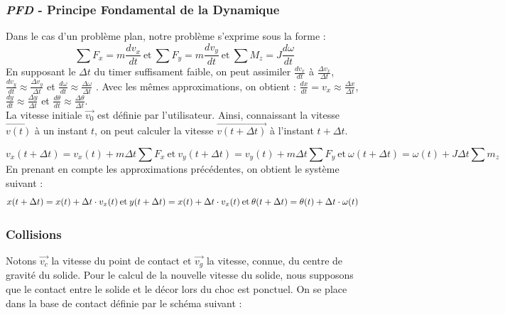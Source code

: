 \subsubsection{\emph{PFD} - Principe Fondamental de la Dynamique }
Dans le cas d'un problème plan, notre problème s'exprime sous la forme :
\begin{equation}
\sum F_x = m \frac {dv_x}{dt} \: \text{et} \: \sum F_y = m\frac{dv_y}{dt} \: \text{et} \: \sum M_z = J \frac {d\omega}{dt}
\end{equation}
En supposant le $\Delta t$ du timer suffisament faible, on peut assimiler
$\frac {dv_x}{dt}$ à $\frac{\Delta v_x}{\Delta t}$,
$ \frac {dv_y}{dt} \approx \frac{\Delta v_y}{\Delta t}$ et
$ \frac{d\omega}{dt} \approx \frac{\Delta \omega}{\Delta t}$ .
\newline
Avec les mêmes approximations, on obtient :
$\frac {dx}{dt} = v_x \approx \frac{\Delta x}{\Delta t}$, 
$ \frac {dy}{dt} \approx \frac{\Delta y}{\Delta t}$ et
$ \frac{d\theta}{dt} \approx \frac{\Delta \theta}{\Delta t}$. \\
La vitesse initiale $\overrightarrow{v_0}$ est définie par l'utilisateur.
Ainsi, connaissant la vitesse $\overrightarrow{v(t)}$ à un instant $t$,
on peut calculer la vitesse $\overrightarrow{v(t+\Delta t)}$ à l'instant $t + \Delta t$.

\begin{equation}
v_{x}(t+\Delta t)= v_{x}(t) + m \Delta t \sum F_x \: \text{et}\:
v_{y}(t+\Delta t)= v_{y}(t) + m\Delta t\sum F_y \: \text{et}\:
\omega (t + \Delta t)= \omega(t) + J\Delta t \sum m_z 
\end{equation}
En prenant en compte les approximations précédentes, on obtient le système suivant :
\begin{equation}
x(t+\Delta t) = x(t) +\Delta t \cdot v_{x}(t) \: \text{et} \:
y(t+\Delta t) = x(t) +\Delta t \cdot v_{x}(t) \: \text{et} \:
\theta (t+\Delta t) = \theta (t) + \Delta t \cdot \omega (t) \: \text \:
\end{equation}

\newpage
\subsubsection{Collisions}
Notons $\overrightarrow{v_c}$ la vitesse du point de contact et $\overrightarrow{v_g}$
la vitesse, connue, du centre de gravité du solide.
Pour le calcul de la nouvelle vitesse du solide, nous supposons que le contact
entre le solide et le décor lors du choc est ponctuel. 
On se place dans la base de contact définie par le schéma suivant :

